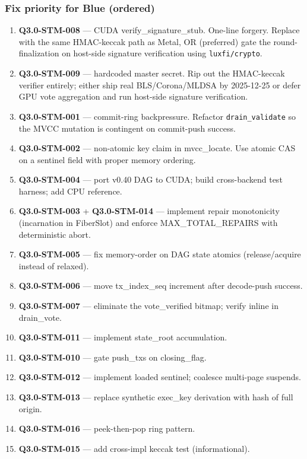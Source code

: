 \documentclass[
]{article}
\providecommand{\tightlist}{%
  \setlength{\itemsep}{0pt}\setlength{\parskip}{0pt}}
\begin{document}
\subsubsection{Fix priority for Blue
(ordered)}\label{fix-priority-for-blue-ordered}

\begin{enumerate}
\def\labelenumi{\arabic{enumi}.}
\tightlist
\item
  \textbf{Q3.0-STM-008} --- CUDA verify\_signature\_stub. One-line
  forgery. Replace with the same HMAC-keccak path as Metal, OR
  (preferred) gate the round-finalization on host-side signature
  verification using \texttt{luxfi/crypto}.
\item
  \textbf{Q3.0-STM-009} --- hardcoded master secret. Rip out the
  HMAC-keccak verifier entirely; either ship real BLS/Corona/MLDSA by
  2025-12-25 or defer GPU vote aggregation and run host-side signature
  verification.
\item
  \textbf{Q3.0-STM-001} --- commit-ring backpressure. Refactor
  \texttt{drain\_validate} so the MVCC mutation is contingent on
  commit-push success.
\item
  \textbf{Q3.0-STM-002} --- non-atomic key claim in mvcc\_locate. Use
  atomic CAS on a sentinel field with proper memory ordering.
\item
  \textbf{Q3.0-STM-004} --- port v0.40 DAG to CUDA; build cross-backend
  test harness; add CPU reference.
\item
  \textbf{Q3.0-STM-003} + \textbf{Q3.0-STM-014} --- implement repair
  monotonicity (incarnation in FiberSlot) and enforce
  MAX\_TOTAL\_REPAIRS with deterministic abort.
\item
  \textbf{Q3.0-STM-005} --- fix memory-order on DAG state atomics
  (release/acquire instead of relaxed).
\item
  \textbf{Q3.0-STM-006} --- move tx\_index\_seq increment after
  decode-push success.
\item
  \textbf{Q3.0-STM-007} --- eliminate the vote\_verified bitmap; verify
  inline in drain\_vote.
\item
  \textbf{Q3.0-STM-011} --- implement state\_root accumulation.
\item
  \textbf{Q3.0-STM-010} --- gate push\_txs on closing\_flag.
\item
  \textbf{Q3.0-STM-012} --- implement loaded sentinel; coalesce
  multi-page suspends.
\item
  \textbf{Q3.0-STM-013} --- replace synthetic exec\_key derivation with
  hash of full origin.
\item
  \textbf{Q3.0-STM-016} --- peek-then-pop ring pattern.
\item
  \textbf{Q3.0-STM-015} --- add cross-impl keccak test (informational).
\end{enumerate}
\end{document}
